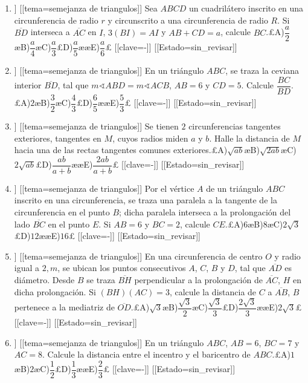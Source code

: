 \begin{enumerate}
\item[\textbf{7.}] [[curso=Geometria]] [[tema=semejanza de triangulos]] Sea $ABCD$ un cuadrilátero inscrito en una circunferencia de radio $r$ y circunscrito a una circunferencia de radio $R$. Si $\overline{BD}$ interseca a $\overline{AC}$ en $I$, $3(BI)=AI$ y $AB+CD=a$, calcule $BC$.£A)$\dfrac{a}{2}$æB)$\dfrac{a}{4}$æC)$\dfrac{a}{3}$£D)$\dfrac{a}{5}$ææE)$\dfrac{a}{6}$£ [[clave=-]] [[Estado=sin_revisar]]
\item[\textbf{8.}] [[curso=Geometria]] [[tema=semejanza de triangulos]] En un triángulo $ABC$, se traza la ceviana interior $\overline{BD}$, tal que $m\sphericalangle ABD=m\sphericalangle ACB$, $AB=6$ y $CD=5$. Calcule $\dfrac{BC}{BD}$.£A)$2$æB)$\dfrac{3}{2}$æC)$\dfrac{4}{3}$£D)$\dfrac{6}{5}$ææE)$\dfrac{5}{3}$£ [[clave=-]] [[Estado=sin_revisar]]
\item[\textbf{9.}] [[curso=Geometria]] [[tema=semejanza de triangulos]] Se tienen $2$ circunferencias tangentes exteriores, tangentes en $M$, cuyos radios miden $a$ y $b$. Halle la distancia de $M$ hacia una de las rectas tangentes comunes exteriores.£A)$\sqrt{ab}$æB)$\sqrt{2ab}$æC)$2\sqrt{ab}$£D)$\dfrac{ab}{a+b}$ææE)$\dfrac{2ab}{a+b}$£ [[clave=-]] [[Estado=sin_revisar]]
\item[\textbf{10.}] [[curso=Geometria]] [[tema=semejanza de triangulos]] Por el vértice $A$ de un triángulo $ABC$ inscrito en una circunferencia, se traza una paralela a la tangente de la circunferencia en el punto $B$; dicha paralela interseca a la prolongación del lado $\overline{BC}$ en el punto $E$. Si $AB=6$ y $BC=2$, calcule $CE$.£A)$6$æB)$8$æC)$2\sqrt{3}$£D)$12$ææE)$16$£ [[clave=-]] [[Estado=sin_revisar]]
\item[\textbf{11.}] [[curso=Geometria]] [[tema=semejanza de triangulos]] En una circunferencia de centro $O$ y radio igual a $2,m$, se ubican los puntos consecutivos $A$, $C$, $B$ y $D$, tal que $\overline{AD}$ es diámetro. Desde $B$ se traza $\overline{BH}$ perpendicular a la prolongación de $\overline{AC}$, $H$ en dicha prolongación. Si $(BH)(AC)=3$, calcule la distancia de $C$ a $\overline{AB}$, $B$ pertenece a la mediatriz de $\overline{OD}$.£A)$\sqrt{3}$æB)$\dfrac{\sqrt{3}}{2}$æC)$\dfrac{\sqrt{3}}{3}$£D)$\dfrac{2\sqrt{3}}{3}$ææE)$2\sqrt{3}$£ [[clave=-]] [[Estado=sin_revisar]]
\item[\textbf{12.}] [[curso=Geometria]] [[tema=semejanza de triangulos]] En un triángulo $ABC$, $AB=6$, $BC=7$ y $AC=8$. Calcule la distancia entre el incentro y el baricentro de $ABC$.£A)$1$æB)$2$æC)$\dfrac{1}{2}$£D)$\dfrac{1}{3}$ææE)$\dfrac{2}{3}$£ [[clave=-]] [[Estado=sin_revisar]]

\end{enumerate}
